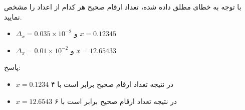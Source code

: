 با توجه به خطای مطلق داده شده، تعداد ارقام صحیح هر کدام از اعداد را مشخص نمایید.

\begin{itemize}
    \item $\Delta_{x} = 0.035 \times 10^{-2}$ و $x = 0.12345$
    \item $\Delta_{x} = 0.01 \times 10^{-2}$ و $x = 12.65433$
\end{itemize}


پاسخ: \\
\begin{itemize}
    \item $x = 0.1234$ در نتیجه تعداد ارقام صحیح برابر است با ۴
    \item $x = 12.6543$ در نتیجه تعداد ارقام صحیح برابر است با ۶
\end{itemize}